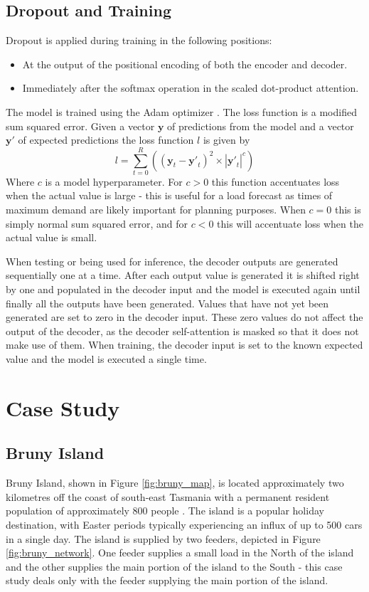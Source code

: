 \documentclass[conference]{IEEEtran}
\begin{document}
\subsection{Dropout and Training}
Dropout is applied during training in the following positions:
\begin{itemize}
	\item At the output of the positional encoding of both the encoder and decoder.
	\item Immediately after the softmax operation in the scaled dot-product attention.
\end{itemize}
The model is trained using the Adam optimizer \cite{Kingma2014}.
The loss function is a modified sum squared error.
Given a vector $\boldsymbol{y}$ of predictions from the model and a vector $\boldsymbol{y'}$ of expected predictions the loss function $l$ is given by 
\begin{equation}
l = \sum_{t=0}^{R}((\boldsymbol{y}_t - \boldsymbol{y'}_t)^2 \times |\boldsymbol{y'}_t|^c)
\end{equation}
Where $c$ is a model hyperparameter.
For $c>0$ this function accentuates loss when the actual value is large - this is useful for a load forecast as times of maximum demand are likely important for planning purposes.
When $c=0$ this is simply normal sum squared error, and for $c<0$ this will accentuate loss when the actual value is small.

When testing or being used for inference, the decoder outputs are generated sequentially one at a time.
After each output value is generated it is shifted right by one and populated in the decoder input and the model is executed again until finally all the outputs have been generated.
Values that have not yet been generated are set to zero in the decoder input.
These zero values do not affect the output of the decoder, as the decoder self-attention is masked so that it does not make use of them.
When training, the decoder input is set to the known expected value and the model is executed a single time.


\section{Case Study}

\subsection{Bruny Island}
Bruny Island, shown in Figure \ref{fig:bruny_map}, is located approximately two kilometres off the coast of south-east Tasmania with a permanent resident population of approximately 800 people \cite{census2016}.
The island is a popular holiday destination, with Easter periods typically experiencing an influx of up to 500 cars in a single day.
The island is supplied by two feeders, depicted in Figure \ref{fig:bruny_network}.
One feeder supplies a small load in the North of the island and the other supplies the main portion of the island to the South - this case study deals only with the feeder supplying the main portion of the island.
\end{document}
